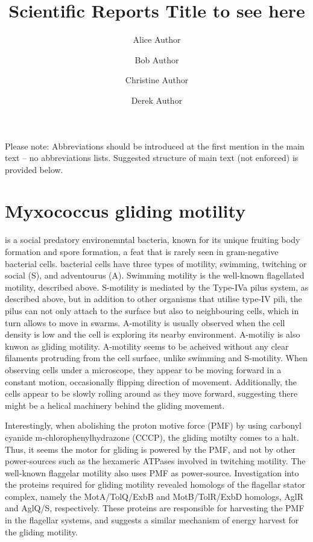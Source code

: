 \documentclass[fleqn,10pt]{wlscirep}
\title{Scientific Reports Title to see here}
\author[1,*]{Alice Author}
\author[2]{Bob Author}
\author[1,2,+]{Christine Author}
\author[2,+]{Derek Author}
\affil[1]{Affiliation, department, city, postcode, country}
\affil[2]{Affiliation, department, city, postcode, country}
\affil[*]{corresponding.author@email.example}
\affil[+]{these authors contributed equally to this work}
\begin{document}
\flushbottom
\maketitle
%
%
\thispagestyle{empty}

\noindent Please note: Abbreviations should be introduced at the first mention in the main text – no abbreviations lists. Suggested structure of main text (not enforced) is provided below.

\section*{Myxococcus gliding motility}
 is a social predatory environemntal bacteria, known for its unique fruiting body formation and spore formation, a feat that is rarely seen in gram-negative bacterial cells.  bacterial cells have three types of motility, swimming, twitching or social (S), and adventourus (A). Swimming motility is the well-known flagellated motility, described above. S-motility is mediated by the Type-IVa pilus system, as described above, but in addition to other organisms that utilise type-IV pili, the pilus can not only attach to the surface but also to neighbouring cells, which in turn allows  to move in swarms. A-motility is usually observed when the cell density is low and the cell is exploring its nearby environment. A-motiliy is also knwon as gliding motility. A-motility seems to be acheived without any clear filaments protruding from the cell surfaec, unlike swimming and S-motility. When observing  cells under a microscope, they appear to be moving forward in a constant motion, occasionally flipping direction of movement. Additionally, the cells appear to be slowly rolling around as they move forward, suggesting there might be a helical machinery behind the gliding movement.

Interestingly, when abolishing the proton motive force (PMF) by using carbonyl cyanide m-chlorophenylhydrazone (CCCP), the gliding motilty comes to a halt. Thus, it seems the motor for gliding is powered by the PMF, and not by other power-sources such as the hexameric ATPases involved in twitching motility. The well-known flaggelar motility also uses PMF as power-source. Investigation into the proteins required for gliding motility revealed homologs of the flagellar stator complex, namely the MotA/TolQ/ExbB and MotB/TolR/ExbD homologs, AglR and AglQ/S, respectively. These proteins are responsible for harvesting the PMF in the flagellar systems, and suggests a similar mechanism of energy harvest for the gliding motility. 
\end{document}
